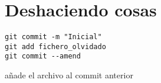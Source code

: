 \documentclass[]{article}
\begin{document}
\section{Deshaciendo cosas}

\begin{verbatim}
git commit -m "Inicial"
git add fichero_olvidado
git commit --amend
\end{verbatim}

añade el archivo al commit anterior
\end{document}
